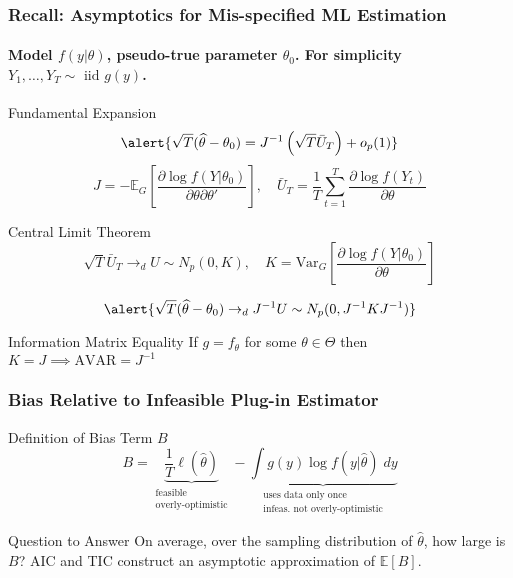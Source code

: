 \begin{frame}
  \frametitle{Recall: Asymptotics for Mis-specified ML Estimation}
  \framesubtitle{Model $f(y|\theta)$, pseudo-true parameter $\theta_0$. For simplicity $Y_1, \dots, Y_T \sim \mbox{ iid } g(y)$.}

  \pause

  \begin{block}{Fundamental Expansion}
    \vspace{-1.5em}
  \[
    \alert{\sqrt{T} ( \widehat{\theta} - \theta_0)   = J^{-1}\left(\sqrt{T} \bar{U}_T\right) + o_p(1)}
  \]
  \footnotesize
\[
      J = -\mathbb{E}_G \left[ \frac{\partial \log f(Y|\theta_0)}{\partial \theta \partial \theta'} \right], \quad
      \bar{U}_T =\frac{1}{T} \sum_{t=1}^T \frac{\partial \log f(Y_t)}{\partial \theta}
\] 
\end{block}

\normalsize

\vspace{-1em}

\pause

\begin{block}{Central Limit Theorem}
  \vspace{-1em}
  \footnotesize
  \[
    \sqrt{T} \bar{U}_T \rightarrow_d U \sim N_p(0, K), \quad
    K = \text{Var}_G\left[\frac{\partial \log f(Y|\theta_0)}{\partial \theta}\right]
  \] 
  \normalsize

  \vspace{-1em}

  \[
    \alert{\sqrt{T}(\widehat{\theta} - \theta_0) \rightarrow_d J^{-1}U \sim N_p(0, J^{-1}KJ^{-1})}
  \]
\end{block}

\vspace{-1em}

\pause

\begin{block}{Information Matrix Equality}
  If $g = f_\theta$ for some $\theta \in \Theta$ then $K = J \implies \text{AVAR} = J^{-1}$
\end{block}

\end{frame}
\begin{frame}
  \frametitle{Bias Relative to Infeasible Plug-in Estimator}


  \begin{block}{Definition of Bias Term $B$}
  \[
    B = \underbrace{\frac{1}{T} \ell(\widehat{\theta})}_{\substack{ \text{feasible}\\ \text{overly-optimistic}}} - \underbrace{\int g(y) \log f(y|\widehat{\theta})\; dy}_{\substack{\text{uses data only once} \\ \text{infeas.\ not overly-optimistic}}}
  \]
\end{block}

\pause

\begin{alertblock}{Question to Answer}
  On average, over the sampling distribution of $\widehat{\theta}$, how large is $B$? AIC and TIC construct an asymptotic approximation of $\mathbb{E}[B]$.
\end{alertblock}

\end{frame}

